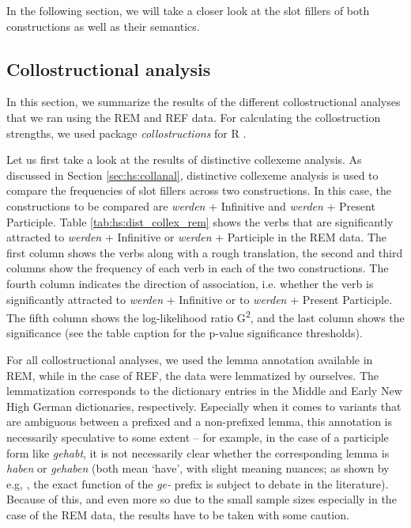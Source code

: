 \documentclass[output=paper,colorlinks,citecolor=brown]{langscibook}
\begin{document}
In the following section, we will take a closer look at the slot fillers of both constructions as well as their semantics.


\subsection{Collostructional analysis} \label{sec:hs:collanalysis}

In this section, we summarize the results of the different collostructional analyses that we ran using the REM and REF data. For calculating the collostruction strengths, we used  package \textit{collostructions} for R \citep[][]{RCoreTeam2021}. 

Let us first take a look at the results of distinctive collexeme analysis. As discussed in Section \ref{sec:hs:collanal}, distinctive collexeme analysis is used to compare the frequencies of slot fillers across two constructions. In this case, the constructions to be compared are \textit{werden} + Infinitive and \textit{werden} + Present Participle. Table \ref{tab:hs:dist_collex_rem} shows the verbs that are significantly attracted to \textit{werden} + Infinitive or \textit{werden} + Participle in the REM data. The first column shows the verbs along with a rough translation, the second and third columns show the frequency of each verb in each of the two constructions. The fourth column indicates the direction of association, i.e. whether the verb is significantly attracted to \textit{werden} + Infinitive or to \textit{werden} + Present Participle. The fifth column shows the log-likelihood ratio G\textsuperscript{2}, and the last column shows the significance (see the table caption for the p-value significance thresholds). 

For all collostructional analyses, we used the lemma annotation available in REM, while in the case of REF, the data were lemmatized by ourselves. The lemmatization corresponds to the dictionary entries in the Middle and Early New High German dictionaries, respectively. Especially when it comes to variants that are ambiguous between a prefixed and a non-prefixed lemma, this annotation is necessarily speculative to some extent -- for example, in the case of a participle form like \textit{gehabt}, it is not necessarily clear whether the corresponding lemma is \textit{haben} or \textit{gehaben} (both mean `have', with slight meaning nuances; as shown by e.g, \cite{fleissnerPrafixGiIm2023}, the exact function of the \textit{ge-} prefix is subject to debate in the literature). Because of this, and even more so due to the small sample sizes especially in the case of the REM data, the results have to be taken with some caution.
\end{document}
